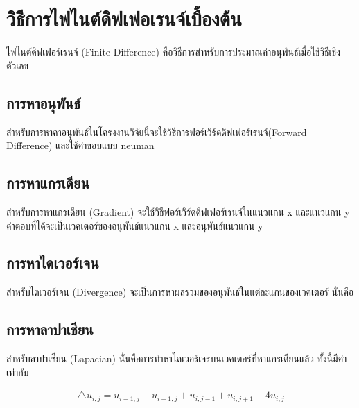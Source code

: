 \section{วิธีการไฟไนต์ดิฟเฟอเรนจ์เบื้องต้น}
ไฟไนต์ดิฟเฟอร์เรนจ์ (Finite Difference) คือวิธีการสำหรับการประมาณค่าอนุพันธ์เมื่อใช้วิธีเชิงตัวเลข

\subsection{การหาอนุพันธ์}
สำหรับการหาคาอนุพันธ์ในโครงงานวิจัยนี้จะใช้วิธีการฟอร์เวิร์ดดิฟเฟอร์เรนจ์(Forward Difference) และใช้ค่าขอบแบบ neuman

\subsection{การหาแกรเดียน}
สำหรับการหาแกรเดียน (Gradient) จะใช้วิธีฟอร์เวิร์ดดิฟเฟอร์เรนจ์ในแนวแกน x และแนวแกน y คำตอบที่ได้จะเป็นเวคเตอร์ของอนุพันธ์แนวแกน x และอนุพันธ์แนวแกน y


\subsection{การหาไดเวอร์เจน}
สำหรับไดเวอร์เจน (Divergence) จะเป็นการหาผลรวมของอนุพันธ์ในแต่ละแกนของเวคเตอร์ นั่นคือ 

\subsection{การหาลาปาเชียน}
สำหรับลาปาเซียน (Lapacian) นั่นคือการทำหาไดเวอร์เจรบนเวคเตอร์ที่หาแกรเดียนแล้ว ทั้งนี้มีค่าเท่ากับ

\begin{align*}
    \triangle u_{i,j} = u_{i-1,j} + u_{i+1,j} + u_{i,j-1} + u_{i,j+1} - 4u_{i,j} 
\end{align*}